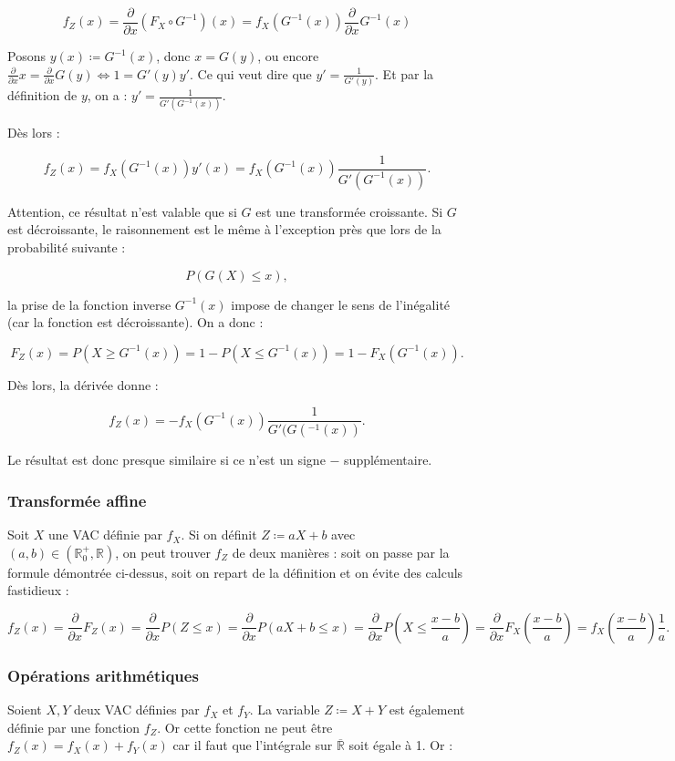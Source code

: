 \documentclass{article}
\renewcommand{\pd}[1]{\frac {\partial}{\partial #1}}
\begin{document}
			\[f_Z(x) = \pd x(F_X \circ G^{-1})(x) = f_X(G^{-1}(x))\pd xG^{-1}(x)\]

			Posons $y(x) \coloneqq G^{-1}(x)$, donc $x = G(y)$, ou encore $\pd xx = \pd xG(y) \iff 1 = G'(y)y'$. Ce qui veut dire que $y' = \frac 1{G'(y)}$. Et par la définition
			de $y$, on a : $y' = \frac 1{G'(G^{-1}(x))}$.
			
			Dès lors :

			\[f_Z(x) = f_X(G^{-1}(x))y'(x) = f_X(G^{-1}(x))\frac 1{G'(G^{-1}(x))}.\]

			Attention, ce résultat n'est valable que si $G$ est une transformée croissante. Si $G$ est décroissante, le raisonnement est le même à l'exception près que lors
			de la probabilité suivante :

			\[P(G(X) \leq x),\]

			la prise de la fonction inverse $G^{-1}(x)$ impose de changer le sens de l'inégalité (car la fonction est décroissante). On a donc :

			\[F_Z(x) = P(X \geq G^{-1}(x)) = 1 - P(X \leq G^{-1}(x)) = 1 - F_X(G^{-1}(x)).\]

			Dès lors, la dérivée donne :

			\[f_Z(x) = -f_X(G^{-1}(x))\frac 1{G'(G(^{-1}(x))}.\]

			Le résultat est donc presque similaire si ce n'est un signe $-$ supplémentaire.

		\subsubsection{Transformée affine}
			Soit $X$ une VAC définie par $f_X$. Si on définit $Z \coloneqq aX + b$ avec $(a, b) \in (\mathbb R_0^+, \mathbb R)$, on peut trouver $f_Z$ de deux manières : soit on passe
			par la formule démontrée ci-dessus, soit on repart de la définition et on évite des calculs fastidieux :

			\[f_Z(x) = \pd xF_Z(x) = \pd xP(Z \leq x) = \pd xP(aX + b \leq x) = \pd xP\left(X \leq \frac {x-b}{a}\right) = \pd xF_X\left(\frac {x-b}a\right) = f_X\left(\frac {x-b}a\right)\frac 1a.\]

		\subsubsection{Opérations arithmétiques}
			Soient $X, Y$ deux VAC définies par $f_X$ et $f_Y$. La variable $Z \coloneqq X + Y$ est également définie par une fonction $f_Z$. Or cette fonction ne peut être
			$f_Z(x) = f_X(x) + f_Y(x)$ car il faut que l'intégrale sur $\overline {\mathbb R}$ soit égale à 1. Or :
\end{document}
